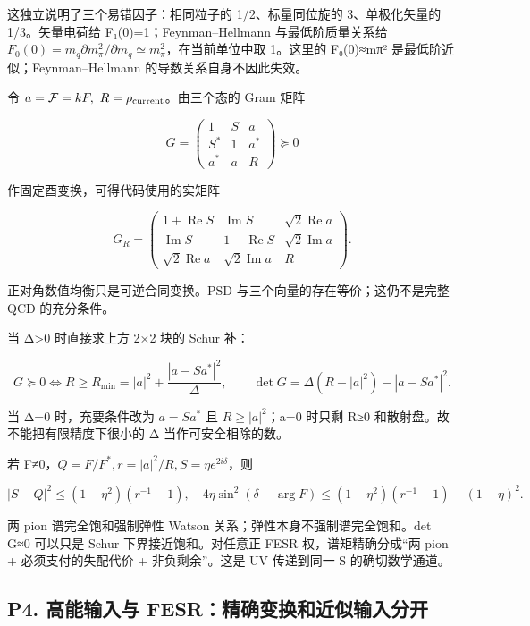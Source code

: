 \documentclass[
  11pt,
  a4paper,
]{article}
\begin{document}
这独立说明了三个易错因子：相同粒子的 1/2、标量同位旋的 3、单极化矢量的
1/3。矢量电荷给 F₁(0)=1；Feynman--Hellmann 与最低阶质量关系给
\(F_0(0)=m_q\partial m_\pi^2/\partial m_q\simeq m_\pi^2\)，在当前单位中取
1。这里的 F₀(0)≈mπ² 是最低阶近似；Feynman--Hellmann
的导数关系自身不因此失效。

令 \(a=\mathcal F=kF,\ R=\rho_{\rm current}\)。由三个态的 Gram 矩阵

\[
G=\begin{pmatrix}1&S&a\\S^*&1&a^*\\a^*&a&R\end{pmatrix}\succeq0
\]

作固定酉变换，可得代码使用的实矩阵

\[
G_R=\begin{pmatrix}1+\operatorname{Re}S&\operatorname{Im}S&\sqrt2\operatorname{Re}a\\
\operatorname{Im}S&1-\operatorname{Re}S&\sqrt2\operatorname{Im}a\\
\sqrt2\operatorname{Re}a&\sqrt2\operatorname{Im}a&R\end{pmatrix}.
\]

正对角数值均衡只是可逆合同变换。PSD 与三个向量的存在等价；这仍不是完整
QCD 的充分条件。

当 Δ\textgreater0 时直接求上方 2×2 块的 Schur 补：

\[
G\succeq0\iff
R\ge R_{\min}=|a|^2+\frac{|a-Sa^*|^2}{\Delta},\qquad
\det G=\Delta(R-|a|^2)-|a-Sa^*|^2.
\]

当 Δ=0 时，充要条件改为 \(a=Sa^*\) 且 \(R\ge|a|^2\)；a=0 时只剩 R≥0
和散射盘。故不能把有限精度下很小的 Δ 当作可安全相除的数。

若 F≠0，\(Q=F/F^*,r=|a|^2/R,S=\eta e^{2i\delta}\)，则

\[
|S-Q|^2\le(1-\eta^2)(r^{-1}-1),
\quad4\eta\sin^2(\delta-\arg F)
\le(1-\eta^2)(r^{-1}-1)-(1-\eta)^2.
\]

两 pion 谱完全饱和强制弹性 Watson 关系；弹性本身不强制谱完全饱和。det
G≈0 可以只是 Schur 下界接近饱和。对任意正 FESR 权，谱矩精确分成``两 pion
+ 必须支付的失配代价 + 非负剩余''。这是 UV 传递到同一 S 的确切数学通道。

\subsection{P4. 高能输入与
FESR：精确变换和近似输入分开}\label{p4.-ux9ad8ux80fdux8f93ux5165ux4e0e-fesrux7cbeux786eux53d8ux6362ux548cux8fd1ux4f3cux8f93ux5165ux5206ux5f00}
\end{document}
